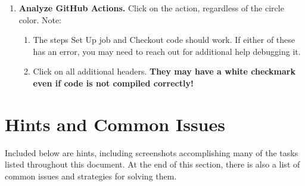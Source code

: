 \documentclass{article} %
\begin{document}
\begin{enumerate}
    \item \textbf{Analyze GitHub Actions.}  Click on the action, regardless of the circle color.  Note:
    \begin{enumerate}
        \item The steps Set Up job and Checkout code should work.  If either of these has an error, you may need to reach out for additional help debugging it.
        \item Click on all additional headers.  \textbf{They may have a white checkmark even if code is not compiled correctly!}
    \end{enumerate}
\end{enumerate}


\section*{Hints and Common Issues}
Included below are hints, including screenshots accomplishing many of the tasks listed throughout this document.  At the end of this section, there is also a list of common issues and strategies for solving them.
\end{document}
